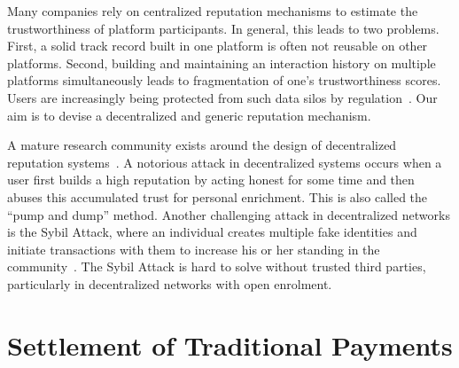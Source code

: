 Many companies rely on centralized reputation mechanisms to estimate the trustworthiness of platform participants.
In general, this leads to two problems.
First, a solid track record built in one platform is often not reusable on other platforms.
Second, building and maintaining an interaction history on multiple platforms simultaneously leads to fragmentation of one's trustworthiness scores.
Users are increasingly being protected from such data silos by regulation~\cite{koops2014trouble}.
Our aim is to devise a decentralized and generic reputation mechanism. %

A mature research community exists around the design of decentralized reputation systems~\cite{delaviz2012sybilres,kamvar2003eigentrust,srivatsa2005trustguard}.
A notorious attack in decentralized systems occurs when a user first builds a high reputation by acting honest for some time and then abuses this accumulated trust for personal enrichment.
This is also called the \enquote{pump and dump} method.
Another challenging attack in decentralized networks is the Sybil Attack, where an individual creates multiple fake identities and initiate transactions with them to increase his or her standing in the community~\cite{douceur2002sybil}.
The Sybil Attack is hard to solve without trusted third parties, particularly in decentralized networks with open enrolment.


\section{Settlement of Traditional Payments}

